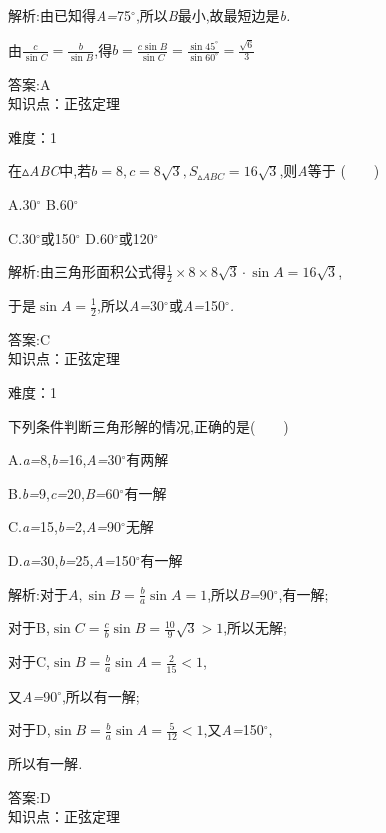 \documentclass{article} %
\begin{document}
 解析:由已知得\textit{A=}75$\mathrm{{}^\circ}$,所以\textit{B}最小,故最短边是\textit{b.}

由$\frac{c}{\sin C}=\frac{b}{\sin B}$,得$b=\frac{c\sin B}{\sin C}=\frac{\sin 45^{\circ}}{\sin 60^{\circ}}=\frac{\sqrt{6}}{3}$
 
 答案:A \\

知识点：正弦定理

难度：1

 在$\mathrm{\vartriangle}$\textit{ABC}中,若$b=8,c=8\sqrt{3},S_{\vartriangle ABC}=16\sqrt{3}$,则\textit{A}等于 (\textit{　　})

 A.30$\mathrm{{}^\circ}$ B.60$\mathrm{{}^\circ}$

 C.30$\mathrm{{}^\circ}$或150$\mathrm{{}^\circ}$ D.60$\mathrm{{}^\circ}$或120$\mathrm{{}^\circ}$

 解析:由三角形面积公式得$\frac{1}{2}\times 8\times 8\sqrt{3}\cdot \sin A=16\sqrt{3}$,

于是$\sin A=\frac{1}{2}$,所以\textit{A=}30$\mathrm{{}^\circ}$或\textit{A=}150$\mathrm{{}^\circ}$\textit{.}

 答案:C \\

知识点：正弦定理

难度：1

 下列条件判断三角形解的情况,正确的是(\textit{　　})

 A.\textit{a=}8,\textit{b=}16,\textit{A=}30$\mathrm{{}^\circ}$有两解

 B.\textit{b=}9,\textit{c=}20,\textit{B=}60$\mathrm{{}^\circ}$有一解

 C.\textit{a=}15,\textit{b=}2,\textit{A=}90$\mathrm{{}^\circ}$无解

 D.\textit{a=}30,\textit{b=}25,\textit{A=}150$\mathrm{{}^\circ}$有一解

 解析:对于$A,\sin B=\frac{b}{a}\sin A=1$,所以\textit{B=}90$\mathrm{{}^\circ}$,有一解;

对于B,$\sin C=\frac{c}{b}\sin B=\frac{10}{9}\sqrt{3}>1$,所以无解;

对于C,$\sin B=\frac{b}{a}\sin A=\frac{2}{15}<1$,

又\textit{A=}90$\mathrm{{}^\circ}$,所以有一解;

对于D,$\sin B=\frac{b}{a}\sin A=\frac{5}{12}<1$,又\textit{A=}150$\mathrm{{}^\circ}$,

所以有一解\textit{.}

 答案:D \\

知识点：正弦定理
\end{document}
